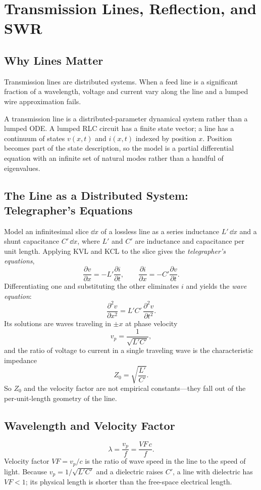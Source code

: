 \chapter{Transmission Lines, Reflection, and SWR}
\label{ch:lines}
\section{Why Lines Matter}
Transmission lines are distributed systems. When a feed line is a significant
fraction of a wavelength, voltage and current vary along the line and a lumped
wire approximation fails.

\begin{controlsbox}
A transmission line is a distributed-parameter dynamical system rather than a
lumped ODE. A lumped RLC circuit has a finite state vector; a line has a
continuum of states \(v(x,t)\) and \(i(x,t)\) indexed by position \(x\). Position
becomes part of the state description, so the model is a partial differential
equation with an infinite set of natural modes rather than a handful of
eigenvalues.
\end{controlsbox}

\section{The Line as a Distributed System: Telegrapher's Equations}
Model an infinitesimal slice \(\dd x\) of a lossless line as a series inductance
\(L'\,\dd x\) and a shunt capacitance \(C'\,\dd x\), where \(L'\) and \(C'\) are
inductance and capacitance per unit length. Applying KVL and KCL to the slice
gives the \emph{telegrapher's equations},
\[
\frac{\partial v}{\partial x}=-L'\frac{\partial i}{\partial t},
\qquad
\frac{\partial i}{\partial x}=-C'\frac{\partial v}{\partial t}.
\]
Differentiating one and substituting the other eliminates \(i\) and yields the
\emph{wave equation}:
\[
\frac{\partial^2 v}{\partial x^2}=L'C'\,\frac{\partial^2 v}{\partial t^2}.
\]
Its solutions are waves traveling in \(\pm x\) at phase velocity
\[
v_p=\frac{1}{\sqrt{L'C'}},
\]
and the ratio of voltage to current in a single traveling wave is the
characteristic impedance
\[
Z_0=\sqrt{\frac{L'}{C'}}.
\]
So \(Z_0\) and the velocity factor are not empirical constants---they fall out of
the per-unit-length geometry of the line.

\section{Wavelength and Velocity Factor}
\[
\lambda=\frac{v_p}{f}=\frac{VF\,c}{f}.
\]
Velocity factor \(VF=v_p/c\) is the ratio of wave speed in the line to the speed
of light. Because \(v_p=1/\sqrt{L'C'}\) and a dielectric raises \(C'\), a line
with dielectric has \(VF<1\); its physical length is shorter than the free-space
electrical length.

